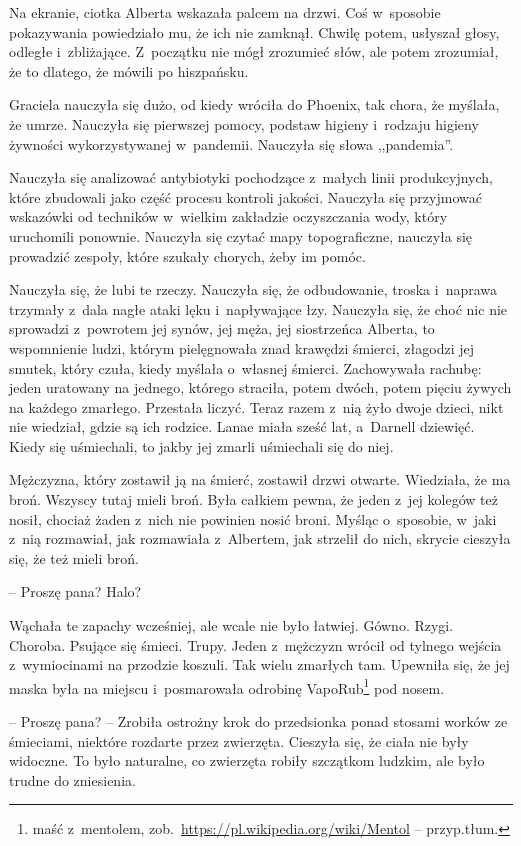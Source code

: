 \documentclass[oneside,polish,11pt,sfheadings]{mwbk}
\begin{document}
Na ekranie, ciotka Alberta wskazała palcem na drzwi. Coś w~sposobie
pokazywania powiedziało mu, że ich nie zamknął. Chwilę potem, usłyszał
głosy, odległe i~zbliżające. Z~początku nie mógł zrozumieć słów, ale
potem zrozumiał, że to dlatego, że mówili po hiszpańsku.

Graciela nauczyła się dużo, od kiedy wróciła do Phoenix, tak chora, że
myślała, że umrze. Nauczyła się pierwszej pomocy, podstaw higieny i~rodzaju higieny żywności wykorzystywanej w~pandemii. Nauczyła się słowa
,,pandemia''.

Nauczyła się analizować antybiotyki pochodzące z~małych linii
produkcyjnych, które zbudowali jako część procesu kontroli jakości.
Nauczyła się przyjmować wskazówki od techników w~wielkim zakładzie
oczyszczania wody, który uruchomili ponownie. Nauczyła się czytać mapy
topograficzne, nauczyła się prowadzić zespoły, które szukały chorych,
żeby im pomóc.

Nauczyła się, że lubi te rzeczy. Nauczyła się, że odbudowanie, troska i~naprawa trzymały z~dala nagłe ataki lęku i~napływające łzy. Nauczyła
się, że choć nic nie sprowadzi z~powrotem jej synów, jej męża, jej
siostrzeńca Alberta, to wspomnienie ludzi, którym pielęgnowała znad
krawędzi śmierci, złagodzi jej smutek, który czuła, kiedy myślała o~własnej śmierci. Zachowywała rachubę: jeden uratowany na jednego,
którego straciła, potem dwóch, potem pięciu żywych na każdego zmarłego.
Przestała liczyć. Teraz razem z~nią żyło dwoje dzieci, nikt nie
wiedział, gdzie są ich rodzice. Lanae miała sześć lat, a~Darnell
dziewięć. Kiedy się uśmiechali, to jakby jej zmarli uśmiechali się do
niej.

Mężczyzna, który zostawił ją na śmierć, zostawił drzwi otwarte.
Wiedziała, że ma broń. Wszyscy tutaj mieli broń. Była całkiem pewna, że
jeden z~jej kolegów też nosił, chociaż żaden z~nich nie powinien nosić
broni. Myśląc o~sposobie, w~jaki z~nią rozmawiał, jak rozmawiała z~Albertem, jak strzelił do nich, skrycie cieszyła się, że też mieli broń.

-- Proszę pana? Halo? 

Wąchała te zapachy wcześniej, ale wcale nie było
łatwiej. Gówno. Rzygi. Choroba. Psujące się śmieci. Trupy. Jeden z~mężczyzn wrócił od tylnego wejścia z~wymiocinami na przodzie koszuli.
Tak wielu zmarłych tam. Upewniła się, że jej maska była na miejscu i~posmarowała odrobinę VapoRub\footnote{ maść z~mentolem,
zob.~\url{https://pl.wikipedia.org/wiki/Mentol} -- przyp.tłum.} pod nosem.

-- Proszę pana? -- Zrobiła ostrożny krok do przedsionka ponad stosami
worków ze śmieciami, niektóre rozdarte przez zwierzęta. Cieszyła się, że
ciała nie były widoczne. To było naturalne, co zwierzęta robiły
szczątkom ludzkim, ale było trudne do zniesienia.
\end{document}
